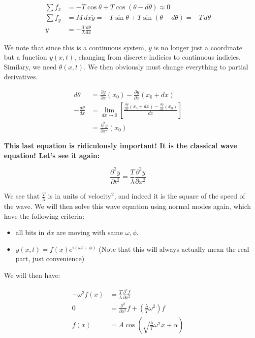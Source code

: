 \documentclass{report}
\begin{document}
\begin{align*}
\sum{f_x} &= -T\cos\theta + T\cos(\theta - d\theta) \approx 0\\
\sum{f_y} &= M \, dx \ddot{y} = -T\sin\theta + T\sin(\theta - d\theta) = -T \, d\theta\\
\ddot{y} &= -\frac{T}{\lambda} \frac{d\theta}{dx}
\end{align*}

We note that since this is a continuous system, $y$ is no longer just a coordinate but a function $y(x,t)$, changing from discrete indicies to continuous indicies. Similary, we need $\theta(x,t)$. We then obviously must change everything to partial derivatives.

\begin{align*}
d \theta &= \frac{\partial y}{\partial x}(x_0) - \frac{\partial y}{\partial x}(x_0 + dx)\\
-\frac{d\theta}{dx} &= \lim_{dx \to 0} \left[\frac{\frac{\partial y}{\partial x}(x_0 + dx) - \frac{\partial y}{\partial x}(x_0)}{dx}\right]\\
&= \frac{\partial^2 y}{\partial x^2}(x_0)
\end{align*}

\textbf{This last equation is ridiculously important! It is the classical wave equation! Let's see it again:}

$$\frac{\partial^2 y}{\partial t^2} = \frac{T}{\lambda} \frac{\partial^2 y}{\partial x^2}$$

We see that $\frac{T}{\lambda}$ is in units of velocity$^2$, and indeed it is the square of the speed of the wave. We will then solve this wave equation using normal modes again, which have the following criteria:

\begin{itemize}
\item all bits in $dx$ are moving with same $\omega, \phi$.
\item $y(x,t) = f(x)e^{i(\omega t + \phi)}$ (Note that this will always actually mean the real part, just convenience)
\end{itemize}

We will then have:

\begin{align*}
-\omega^2f(x) &= \frac{T}{\lambda}\frac{\partial^2 f}{\partial x^2}\\
0 &= \frac{\partial^2}{\partial x^2}f + \left(\frac{\lambda}{T}\omega^2\right)f\\
f(x) &= A \cos\left(\sqrt{\frac{\lambda}{T}\omega^2}x + \alpha\right)
\end{align*}
\end{document}
